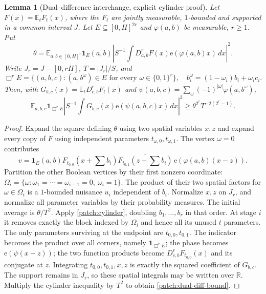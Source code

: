 \documentclass[11pt]{article}
\newtheorem{lemma}[lemma]{Lemma}
\theoremstyle{definition}
\newcommand{\ee}[1]{\mathrm e\!\left(#1\right)}
\begin{document}
\begin{lemma}[Dual--difference interchange, explicit cylinder proof]\label{patch:dual-difference}
Let $F(x)=\mathbb E_tF_t(x)$, where the $F_t$ are jointly measurable, $1$-bounded and supported
in a common interval $J$.  Let $E\subseteq[0,H]^{2r}$ and $\varphi(a,b)$ be measurable, $r\geq1$.
Put
\[
 \theta=\mathbb E_{a,b\in[0,H]^r}\mathbf1_E(a,b)
           \left|S^{-1}\int D_{a,b}^{r}F(x)\ee{\varphi(a,b)x}\,dx\right|^2.
\]
Write $J_r=J-[0,rH]$, $T=|J_r|/S$, and
\[
 \Box^r E=\{(a,b,c): (a,b^\omega)\in E\text{ for every }\omega\in\{0,1\}^r\},
 \quad b_i^\omega=(1-\omega_i)b_i+\omega_i c_i.
\]
Then, with $G_{b,c}(x)=\mathbb E_tD_{c,b}^{r}F_t(x)$ and
$\psi(a,b,c)=\sum_\omega(-1)^{|\omega|}\varphi(a,b^\omega)$,
\begin{equation}\label{patch:dual-diff-bound}
 \mathbb E_{a,b,c}\mathbf1_{\Box^r E}
       \left|S^{-1}\int G_{b,c}(x)\ee{\psi(a,b,c)x}\,dx\right|^2
 \geq\theta^{2^r}T^{-2(2^r-1)}.
\end{equation}
\end{lemma}
\begin{proof}
Expand the square defining $\theta$ using two spatial variables $x,z$ and expand every copy
of $F$ using independent parameters $t_{\omega,0},t_{\omega,1}$.
The vertex $\omega=0$ contributes
\[
 v=\mathbf1_E(a,b)F_{t_{0,0}}(x+\textstyle\sum b_i)
       \overline{F_{t_{0,1}}(z+\textstyle\sum b_i)}\,
       \ee{\varphi(a,b)(x-z)}.
\]
Partition the other Boolean vertices by their first nonzero coordinate:
$\Omega_i=\{\omega:\omega_1=\cdots=\omega_{i-1}=0,\ \omega_i=1\}$.
The product of their two spatial factors for $\omega\in\Omega_i$ is a $1$-bounded nuisance
$u_i$ independent of $b_i$.  Normalize $x,z$ on $J_r$, and normalize all parameter variables
by their probability measures.  The initial average is $\theta/T^2$.
Apply \cref{patch:cylinder}, doubling $b_1,\ldots,b_r$ in that order.
At stage $i$ it removes exactly the block indexed by $\Omega_i$ and hence all its unused
$t$ parameters.  The only parameters surviving at the endpoint are $t_{0,0},t_{0,1}$.
The indicator becomes the product over all corners, namely $\mathbf1_{\Box^r E}$;
the phase becomes $\ee{\psi(x-z)}$; the two function products become
$D_{c,b}^{r}F_{t_{0,0}}(x)$ and its conjugate at $z$.
Integrating $t_{0,0},t_{0,1},x,z$ is exactly the squared coefficient of $G_{b,c}$.
The support remains in $J_r$, so these spatial integrals may be written over $\mathbb R$.
Multiply the cylinder inequality by $T^2$ to obtain \eqref{patch:dual-diff-bound}.
\end{proof}
\end{document}
